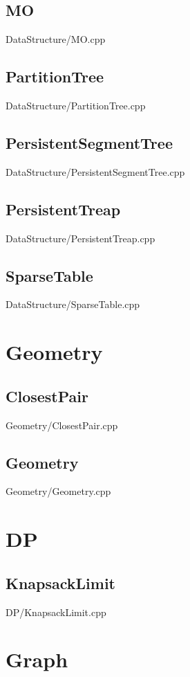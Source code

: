    \subsection{MO}
         {DataStructure/MO.cpp}
    \subsection{PartitionTree}
         {DataStructure/PartitionTree.cpp}
    \subsection{PersistentSegmentTree}
         {DataStructure/PersistentSegmentTree.cpp}
    \subsection{PersistentTreap}
         {DataStructure/PersistentTreap.cpp}
    \subsection{SparseTable}
         {DataStructure/SparseTable.cpp}

\section{Geometry}
    \subsection{ClosestPair}
         {Geometry/ClosestPair.cpp}
    \subsection{Geometry}
         {Geometry/Geometry.cpp}

\section{DP}
    \subsection{KnapsackLimit}
         {DP/KnapsackLimit.cpp}
    

\section{Graph}
